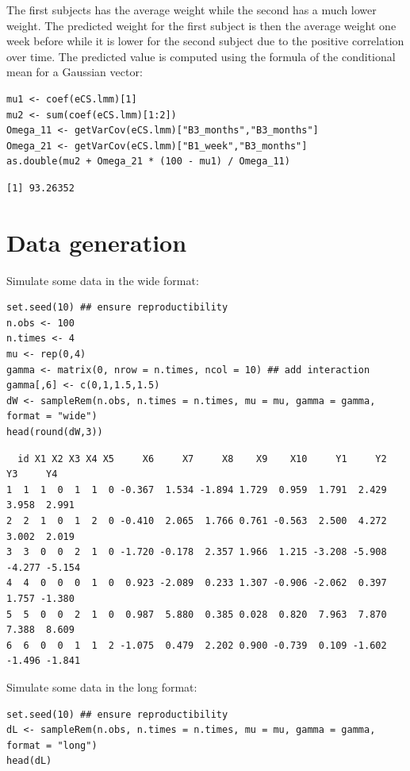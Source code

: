 \documentclass[12pt]{article}
\begin{document}
The first subjects has the average weight while the second has a much
  lower weight. The predicted weight for the first subject is then the
  average weight one week before while it is lower for the second
  subject due to the positive correlation over time. The predicted
  value is computed using the formula of the conditional mean for a
  Gaussian vector:
\lstset{language=r,label= ,caption= ,captionpos=b,numbers=none}
\begin{lstlisting}
mu1 <- coef(eCS.lmm)[1]
mu2 <- sum(coef(eCS.lmm)[1:2])
Omega_11 <- getVarCov(eCS.lmm)["B3_months","B3_months"]
Omega_21 <- getVarCov(eCS.lmm)["B1_week","B3_months"]
as.double(mu2 + Omega_21 * (100 - mu1) / Omega_11)
\end{lstlisting}

\begin{verbatim}
[1] 93.26352
\end{verbatim}



\clearpage

\section{Data generation}
\label{sec:org8b57def}
Simulate some data in the wide format:
\lstset{language=r,label= ,caption= ,captionpos=b,numbers=none}
\begin{lstlisting}
set.seed(10) ## ensure reproductibility
n.obs <- 100
n.times <- 4
mu <- rep(0,4)
gamma <- matrix(0, nrow = n.times, ncol = 10) ## add interaction
gamma[,6] <- c(0,1,1.5,1.5)
dW <- sampleRem(n.obs, n.times = n.times, mu = mu, gamma = gamma, format = "wide")
head(round(dW,3))
\end{lstlisting}

\begin{verbatim}
  id X1 X2 X3 X4 X5     X6     X7     X8    X9    X10     Y1     Y2     Y3     Y4
1  1  1  0  1  1  0 -0.367  1.534 -1.894 1.729  0.959  1.791  2.429  3.958  2.991
2  2  1  0  1  2  0 -0.410  2.065  1.766 0.761 -0.563  2.500  4.272  3.002  2.019
3  3  0  0  2  1  0 -1.720 -0.178  2.357 1.966  1.215 -3.208 -5.908 -4.277 -5.154
4  4  0  0  0  1  0  0.923 -2.089  0.233 1.307 -0.906 -2.062  0.397  1.757 -1.380
5  5  0  0  2  1  0  0.987  5.880  0.385 0.028  0.820  7.963  7.870  7.388  8.609
6  6  0  0  1  1  2 -1.075  0.479  2.202 0.900 -0.739  0.109 -1.602 -1.496 -1.841
\end{verbatim}


Simulate some data in the long format:
\lstset{language=r,label= ,caption= ,captionpos=b,numbers=none}
\begin{lstlisting}
set.seed(10) ## ensure reproductibility
dL <- sampleRem(n.obs, n.times = n.times, mu = mu, gamma = gamma, format = "long")
head(dL)
\end{lstlisting}
\end{document}
